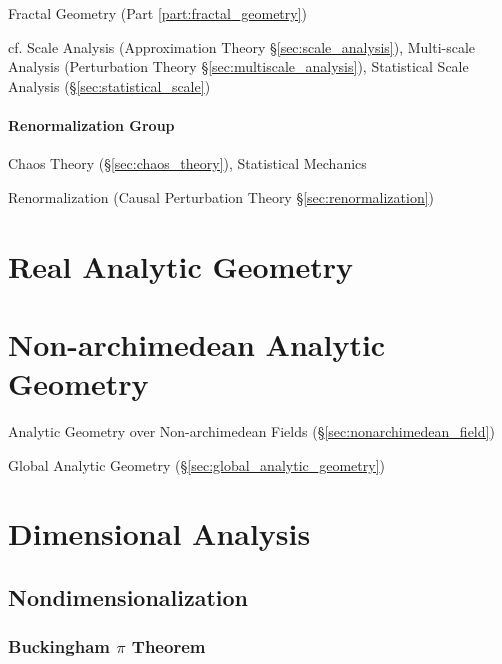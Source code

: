 \fist Fractal Geometry (Part \ref{part:fractal_geometry})

cf. Scale Analysis (Approximation Theory \S\ref{sec:scale_analysis}),
  Multi-scale Analysis (Perturbation Theory \S\ref{sec:multiscale_analysis}),
Statistical Scale Analysis (\S\ref{sec:statistical_scale})



\paragraph{Renormalization Group}\label{sec:renormalization_group}\hfill

Chaos Theory (\S\ref{sec:chaos_theory}), Statistical Mechanics

Renormalization (Causal Perturbation Theory \S\ref{sec:renormalization})



\section{Real Analytic Geometry}\label{sec:real_analytic_geometry}

\section{Non-archimedean Analytic Geometry}
\label{sec:nonarchimedean_analytic_geometry}

Analytic Geometry over Non-archimedean Fields (\S\ref{sec:nonarchimedean_field})

\fist Global Analytic Geometry (\S\ref{sec:global_analytic_geometry})



\section{Dimensional Analysis}\label{sec:dimensional_analysis}


\subsection{Nondimensionalization}\label{sec:nondimensionalization}

\subsubsection{Buckingham $\pi$ Theorem}\label{sec:buckingham_pi}
